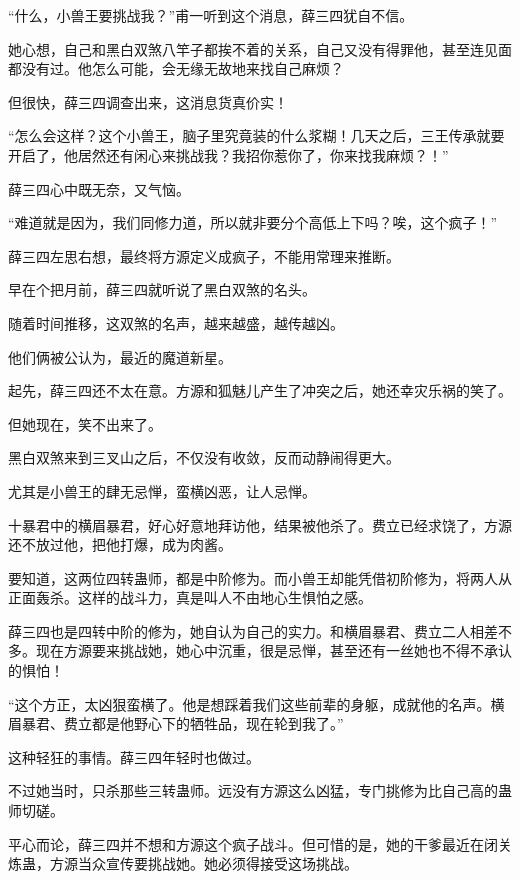 
\begin{this_body}



“什么，小兽王要挑战我？”甫一听到这个消息，薛三四犹自不信。

她心想，自己和黑白双煞八竿子都挨不着的关系，自己又没有得罪他，甚至连见面都没有过。他怎么可能，会无缘无故地来找自己麻烦？

但很快，薛三四调查出来，这消息货真价实！

“怎么会这样？这个小兽王，脑子里究竟装的什么浆糊！几天之后，三王传承就要开启了，他居然还有闲心来挑战我？我招你惹你了，你来找我麻烦？！”

薛三四心中既无奈，又气恼。

“难道就是因为，我们同修力道，所以就非要分个高低上下吗？唉，这个疯子！”

薛三四左思右想，最终将方源定义成疯子，不能用常理来推断。

早在个把月前，薛三四就听说了黑白双煞的名头。

随着时间推移，这双煞的名声，越来越盛，越传越凶。

他们俩被公认为，最近的魔道新星。

起先，薛三四还不太在意。方源和狐魅儿产生了冲突之后，她还幸灾乐祸的笑了。

但她现在，笑不出来了。

黑白双煞来到三叉山之后，不仅没有收敛，反而动静闹得更大。

尤其是小兽王的肆无忌惮，蛮横凶恶，让人忌惮。

十暴君中的横眉暴君，好心好意地拜访他，结果被他杀了。费立已经求饶了，方源还不放过他，把他打爆，成为肉酱。

要知道，这两位四转蛊师，都是中阶修为。而小兽王却能凭借初阶修为，将两人从正面轰杀。这样的战斗力，真是叫人不由地心生惧怕之感。

薛三四也是四转中阶的修为，她自认为自己的实力。和横眉暴君、费立二人相差不多。现在方源要来挑战她，她心中沉重，很是忌惮，甚至还有一丝她也不得不承认的惧怕！

“这个方正，太凶狠蛮横了。他是想踩着我们这些前辈的身躯，成就他的名声。横眉暴君、费立都是他野心下的牺牲品，现在轮到我了。”

这种轻狂的事情。薛三四年轻时也做过。

不过她当时，只杀那些三转蛊师。远没有方源这么凶猛，专门挑修为比自己高的蛊师切磋。

平心而论，薛三四并不想和方源这个疯子战斗。但可惜的是，她的干爹最近在闭关炼蛊，方源当众宣传要挑战她。她必须得接受这场挑战。


\end{this_body}
